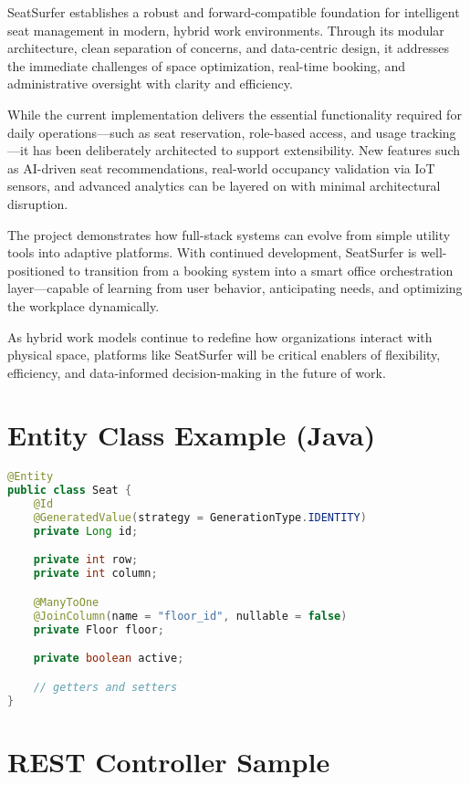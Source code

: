 \documentclass[12pt,a4paper]{report}
\begin{document}
SeatSurfer establishes a robust and forward-compatible foundation for intelligent seat management in modern, hybrid work environments. Through its modular architecture, clean separation of concerns, and data-centric design, it addresses the immediate challenges of space optimization, real-time booking, and administrative oversight with clarity and efficiency.

While the current implementation delivers the essential functionality required for daily operations—such as seat reservation, role-based access, and usage tracking—it has been deliberately architected to support extensibility. New features such as AI-driven seat recommendations, real-world occupancy validation via IoT sensors, and advanced analytics can be layered on with minimal architectural disruption.

The project demonstrates how full-stack systems can evolve from simple utility tools into adaptive platforms. With continued development, SeatSurfer is well-positioned to transition from a booking system into a smart office orchestration layer—capable of learning from user behavior, anticipating needs, and optimizing the workplace dynamically.

As hybrid work models continue to redefine how organizations interact with physical space, platforms like SeatSurfer will be critical enablers of flexibility, efficiency, and data-informed decision-making in the future of work.

\newpage

\appendix

\chapter{Entity Class Example (Java)}
\label{appendix:entity}

\begin{lstlisting}[language=Java, caption=Seat Entity (Java), label=lst:seat-entity]
@Entity
public class Seat {
    @Id
    @GeneratedValue(strategy = GenerationType.IDENTITY)
    private Long id;

    private int row;
    private int column;

    @ManyToOne
    @JoinColumn(name = "floor_id", nullable = false)
    private Floor floor;

    private boolean active;

    // getters and setters
}
\end{lstlisting}

\chapter{REST Controller Sample}
\label{appendix:controller}
\end{document}
